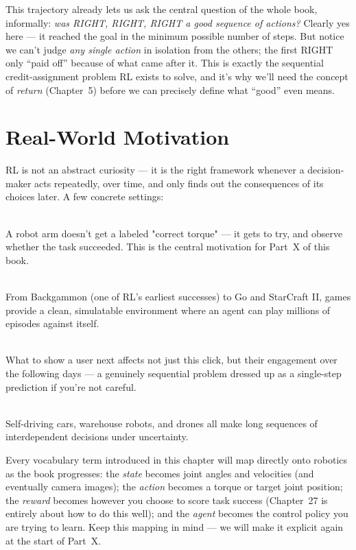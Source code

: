 This trajectory already lets us ask the central question of the whole
book, informally: \emph{was RIGHT, RIGHT, RIGHT a good sequence of
actions?} Clearly yes here — it reached the goal in the minimum possible
number of steps. But notice we can't judge \emph{any single action} in
isolation from the others; the first RIGHT only ``paid off'' because of
what came after it. This is exactly the sequential credit-assignment
problem RL exists to solve, and it's why we'll need the concept of
\emph{return} (Chapter~5) before we can precisely define what ``good''
even means.

\section{Real-World Motivation}

RL is not an abstract curiosity — it is the right framework whenever a
decision-maker acts repeatedly, over time, and only finds out the
consequences of its choices later. A few concrete settings:

\begin{description}[leftmargin=1.6cm, style=nextline]
  \item[Robotics] \hfill \\
  A robot arm doesn't get a labeled "correct torque" — it gets to try, and
  observe whether the task succeeded. This is the central motivation for
  Part~X of this book.

  \item[Games] \hfill \\
  From Backgammon (one of RL's earliest successes) to Go and StarCraft II,
  games provide a clean, simulatable environment where an agent can play
  millions of episodes against itself.

  \item[Recommendation systems] \hfill \\
  What to show a user next affects not just this click, but their
  engagement over the following days — a genuinely sequential problem
  dressed up as a single-step prediction if you're not careful.

  \item[Autonomous systems] \hfill \\
  Self-driving cars, warehouse robots, and drones all make long sequences
  of interdependent decisions under uncertainty.
\end{description}

\begin{robotics}
Every vocabulary term introduced in this chapter will map directly onto
robotics as the book progresses: the \emph{state} becomes joint angles
and velocities (and eventually camera images); the \emph{action} becomes
a torque or target joint position; the \emph{reward} becomes however you
choose to score task success (Chapter~27 is entirely about how to do this
well); and the \emph{agent} becomes the control policy you are trying to
learn. Keep this mapping in mind — we will make it explicit again at the
start of Part~X.
\end{robotics}

